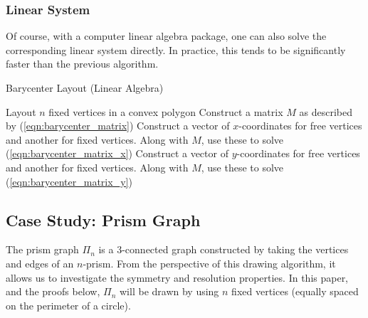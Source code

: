 \documentclass[11pt]{report}
\begin{document}
\subsubsection{Linear System}
Of course, with a computer linear algebra package, one can also solve the corresponding linear system directly. In practice, this tends to be significantly faster than the previous algorithm.

\begin{algorithm}[H]
    \caption{Barycenter Layout (Linear Algebra)}\label{barycenter_la}
    \begin{algorithmic}[1]       
        \State Layout $n$ fixed vertices in a convex polygon
        \State Construct a matrix $M$ as described by (\ref{eqn:barycenter_matrix})
        \State Construct a vector of $x$-coordinates for free vertices and another for fixed vertices. Along with $M$, use these to solve (\ref{eqn:barycenter_matrix_x})
        \State Construct a vector of $y$-coordinates for free vertices and another for fixed vertices. Along with $M$, use these to solve (\ref{eqn:barycenter_matrix_y})
        \EndProcedure
    \end{algorithmic}
\end{algorithm}

\subsection{Case Study: Prism Graph}
The prism graph $\Pi_{n}$ is a 3-connected graph constructed by taking the vertices and edges of an $n$-prism. From the perspective of this drawing algorithm, it allows us to investigate the symmetry and resolution properties. In this paper, and the proofs below, $\Pi_{n}$ will be drawn by using $n$ fixed vertices (equally spaced on the perimeter of a circle).
\end{document}
